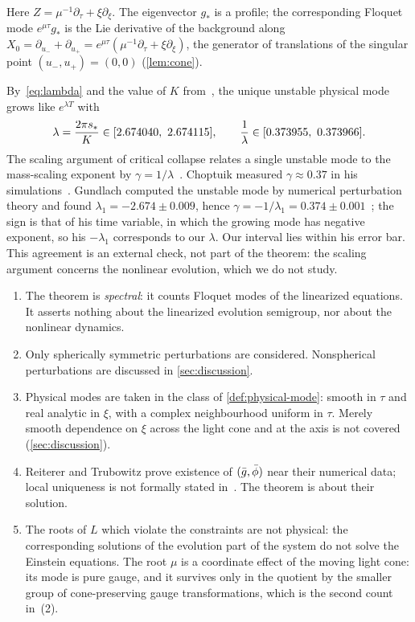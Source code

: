 Here $Z=\mu^{-1}\partial_\tau+\xi\partial_\xi$. The eigenvector $g_*$ is a profile; the corresponding Floquet
mode $e^{\mu\tau}g_*$ is the Lie derivative of the background along $X_0=\partial_{u_-}+\partial_{u_+}=e^{\mu\tau}(\mu^{-1}\partial_\tau+\xi\partial_\xi)$,
the generator of translations of the singular point $(u_-,u_+)=(0,0)$ (\cref{lem:cone}).

\begin{remark}\label{rem:gamma}
By~\eqref{eq:lambda} and the value of $K$ from~\cite{RT2019}, the unique unstable physical mode grows like
$e^{\lambda T}$ with
\[
  \lambda=\frac{2\pi\sphys}{K}\in[2.674040,\ 2.674115],\qquad
  \frac{1}{\lambda}\in[0.373955,\ 0.373966].
\]
The scaling argument of critical collapse relates a single unstable mode to the mass-scaling exponent by
$\gamma=1/\lambda$~\cite{KoikeHaraAdachi1995,Gundlach1997}. Choptuik measured $\gamma\approx0.37$ in his
simulations~\cite{Choptuik1993}. Gundlach computed the unstable mode by numerical perturbation theory and found
$\lambda_1=-2.674\pm0.009$, hence $\gamma=-1/\lambda_1=0.374\pm0.001$~\cite{Gundlach1997}; the sign is that of his
time variable, in which the growing mode has negative exponent, so his $-\lambda_1$ corresponds to our
$\lambda$. Our interval lies within his error bar. This agreement is an external check, not part of the theorem: the
scaling argument concerns the nonlinear evolution, which we do not study.
\end{remark}

\begin{remark}\label{rem:scope}
\begin{enumerate}[label=(\alph*),leftmargin=*]
\item The theorem is \emph{spectral}: it counts Floquet modes of the linearized equations. It asserts
  nothing about the linearized evolution semigroup, nor about the nonlinear dynamics.
\item Only spherically symmetric perturbations are considered. Nonspherical perturbations are discussed
  in \cref{sec:discussion}.
\item Physical modes are taken in the class of \cref{def:physical-mode}: smooth in $\tau$ and real
  analytic in $\xi$, with a complex neighbourhood uniform in $\tau$. Merely smooth dependence on $\xi$
  across the light cone and at the axis is not covered (\cref{sec:discussion}).
\item Reiterer and Trubowitz prove existence of $(\bar g,\bar\phi)$ near their numerical data; local
  uniqueness is not formally stated in~\cite{RT2019}. The theorem is about their solution.
\item The roots of $L$ which violate the constraints are not physical: the corresponding solutions of
  the evolution part of the system do not solve the Einstein equations. The root $\mu$ is a coordinate
  effect of the moving light cone: its mode is pure gauge, and it survives only in the quotient by the smaller
  group of cone-preserving gauge transformations, which is the second count in~(2).
\end{enumerate}
\end{remark}


